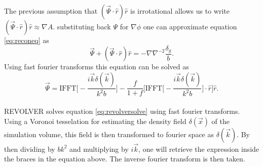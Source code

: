The previous assumption that $(\vec{\Psi}\cdot\hat{r})\hat{r}$ is irrotational
allows us to write $(\vec{\Psi}\cdot\hat{r})\hat{r}\approx\nabla A$.
substituting back $\Psi$ for $\nabla\phi$ one can approximate equation
\ref{eq:reconeq} as 
\begin{equation}
    \vec{\Psi}+(\vec{\Psi}\cdot\hat{r})\hat{r}=-\nabla\nabla^{-2}\frac{\delta_g}{b}.
\end{equation}
Using fast fourier transforms this equation can be solved as \cite{Burden_reconstruction}
\begin{equation}\label{eq:revolversolve}
    \vec{\Psi}=\mathrm{IFFT}\Big[-\frac{i\vec{k}\delta(\vec{k})}{k^2b}\Big]-\frac{f}{1+f}\Big[\mathrm{IFFT}\Big[-\frac{i\vec{k}\delta(\vec{k})}{k^2b}\Big]\cdot\hat{r}\Big]\hat{r}.
\end{equation}
\\\indent
REVOLVER solves equation \ref{eq:revolversolve} using fast fourier transforms.
Using a Voronoi tesselation for estimating the density field $\delta(\vec{x})$ of
the simulation volume, this field is then transformed to fourier space as
$\delta(\vec{k})$. By then dividing by $bk^2$ and multiplying by $i\vec{k}$, one
will retrieve the expression inside the braces in the equation above. The
inverse fourier transform is then taken.

